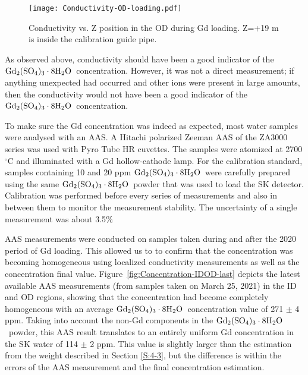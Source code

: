 \documentclass[preprint,12pt]{elsarticle}
\newcommand{\GdSOw}{$\rm Gd_2(\rm SO_4)_3\cdot \rm 8H_2O$\ }
\begin{document}
\begin{figure}[htb]
\centering\texttt{[image: Conductivity-OD-loading.pdf]}
\caption{Conductivity vs. Z position in the OD during Gd loading. Z=+19 m is inside the calibration guide pipe.}
\label{fig:Conductivity-OD-loading}
\end{figure}


As observed above, conductivity should have been a good indicator of the \GdSOw concentration. However, it was not a direct measurement; if anything unexpected had occurred and other ions were present in large amounts, then the conductivity would not have been a good indicator of the \GdSOw concentration. 

To make sure the Gd concentration was indeed as expected, most water samples were analysed with an AAS. A Hitachi polarized Zeeman AAS of the ZA3000 series was used with Pyro Tube HR cuvettes. The samples were atomized at 2700 $^\circ$C and illuminated with a Gd hollow-cathode lamp. For the calibration standard, samples containing 10 and 20 ppm \GdSOw were carefully prepared using the same \GdSOw powder that was used to load the SK detector. Calibration was performed before every series of measurements and also in between them to monitor the measurement stability. The uncertainty of a single measurement was about 3.5$\%$

AAS measurements were conducted on samples taken during and after the 2020 period of Gd loading. %
This allowed us to to confirm that the concentration was becoming homogeneous using  localized conductivity measurements as well as the concentration final value.
Figure~\ref{fig:Concentration-IDOD-last} depicts the latest available AAS measurements (from samples taken on March 25, 2021) in the ID and OD regions, showing that the concentration had become completely homogeneous with an average \GdSOw concentration value of 271 $\pm$ 4 ppm. Taking into account the non-Gd components in the \GdSOw powder, this AAS result translates to an entirely uniform Gd concentration in the SK water of 114 $\pm$ 2 ppm.
This value is slightly larger than the estimation from the
weight described in Section \ref{S:4-3}, but the difference is within the errors of the AAS measurement and the final concentration estimation.
\end{document}
